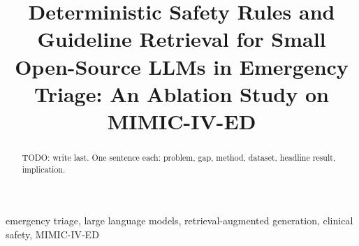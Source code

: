 \documentclass[conference]{IEEEtran}
\begin{document}
\title{Deterministic Safety Rules and Guideline Retrieval for Small Open-Source LLMs in Emergency Triage: An Ablation Study on MIMIC-IV-ED}

\author{
}

\maketitle

\begin{abstract}
TODO: write last. One sentence each: problem, gap, method, dataset, headline result, implication.
\end{abstract}

\begin{IEEEkeywords}
emergency triage, large language models, retrieval-augmented generation, clinical safety, MIMIC-IV-ED
\end{IEEEkeywords}











\end{document}
